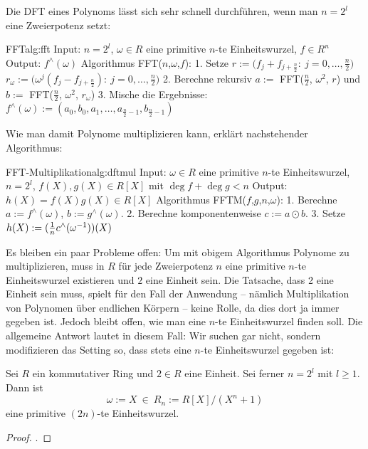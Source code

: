 Die DFT eines Polynoms lässt sich sehr schnell durchführen, wenn man
$n = 2^l$ eine Zweierpotenz setzt:
\begin{pseudocode}{FFT}{alg:fft}
Input: $n = 2^l$, $\omega \in R$ eine primitive $n$-te Einheitswurzel, $f \in R^n$
Output: $f^\wedge(\omega)$
Algorithmus FFT($n$,$\omega$,$f$):
  1. Setze
    $r := \big(f_j + f_{j+\frac n 2}:\ j=0,\ldots,\tfrac n 2\big)$
    $r_\omega := \big( \omega^j (f_j - f_{j+\frac n 2}):\
         j=0,\ldots,\tfrac n 2\big)$
  2. Berechne rekursiv $a := $ FFT($\tfrac n 2$, $\omega^2$, $r$) und $b := $ FFT($\tfrac n 2$, $\omega^2$, $r_\omega$)
  3. Mische die Ergebnisse: $f^\wedge(\omega) := (a_0,b_0,a_1,\ldots,
      a_{\frac n 2 -1},b_{\frac n 2 -1})$
\end{pseudocode}

Wie man damit Polynome multiplizieren kann, erklärt nachstehender Algorithmus:
\begin{pseudocode}{FFT-Multiplikation}{alg:dftmul}
Input: $\omega \in R$ eine primitive $n$-te Einheitswurzel, $n = 2^l$,
       $f(X),g(X) \in R[X]$ mit $\deg f + \deg g < n$
Output: $h(X) = f(X)g(X) \in R[X]$
Algorithmus FFTM($f$,$g$,$n$,$\omega$):
  1. Berechne $a := f^\wedge(\omega)$, $b := g^\wedge(\omega)$.
  2. Berechne komponentenweise $c := a\odot b$.
  3. Setze $h(X) := (\tfrac 1 n c^\wedge(\omega^{-1}))(X)$
\end{pseudocode}


Es bleiben ein paar Probleme offen: Um mit obigem Algorithmus Polynome zu
multiplizieren, muss in $R$ für jede Zweierpotenz $n$ eine primitive $n$-te
Einheitswurzel existieren und $2$ eine Einheit sein. Die Tatsache, dass 2 eine
Einheit sein muss, spielt für den Fall der Anwendung -- nämlich Multiplikation 
von Polynomen über endlichen Körpern -- keine Rolle, da dies dort ja immer 
gegeben ist. Jedoch bleibt offen, wie man eine $n$-te Einheitswurzel finden 
soll.  Die allgemeine Antwort lautet in diesem Fall: Wir suchen gar nicht, 
sondern modifizieren das Setting so, dass stets eine $n$-te Einheitswurzel 
gegeben ist:

\begin{lemma}
  Sei $R$ ein kommutativer Ring und $2 \in R$ eine Einheit. Sei ferner
  $n = 2^l$ mit $l\geq 1$. Dann ist 
  \[ \omega := X\  \in\ R_n := R[X]\big/(X^n+1)\]
  eine primitive $(2n)$-te Einheitswurzel.
\end{lemma}
\begin{proof}
  \autocite[Lemma 4.15]{fft}.
\end{proof}

